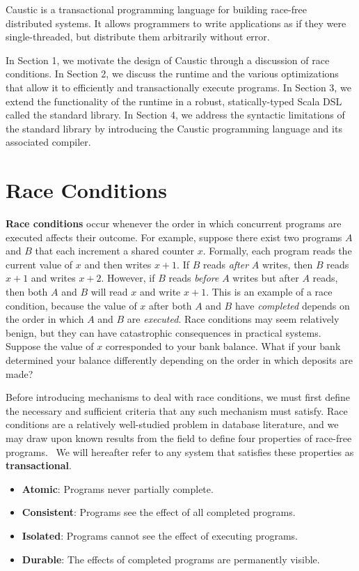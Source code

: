 \documentclass[../main.tex]{subfiles}
\begin{document}
Caustic is a transactional programming language for building race-free distributed systems. It
allows programmers to write applications as if they were single-threaded, but distribute them
arbitrarily without error.

In Section 1, we motivate the design of Caustic through a discussion of race conditions. In Section
2, we discuss the runtime and the various optimizations that allow it to efficiently and
transactionally execute programs. In Section 3, we extend the functionality of the runtime in a
robust, statically-typed Scala DSL called the standard library. In Section 4, we address
the syntactic limitations of the standard library by introducing the Caustic programming language
and its associated compiler.

\section{Race Conditions}
\textbf{Race conditions} occur whenever the order in which concurrent programs are executed affects
their outcome. For example, suppose there exist two programs $A$ and $B$ that each increment a
shared counter $x$. Formally, each program reads the current value of $x$ and then writes $x + 1$.
If $B$ reads \emph{after} $A$ writes, then $B$ reads $x + 1$ and writes $x + 2$. However, if $B$
reads \emph{before} $A$ writes but after $A$ reads, then both $A$ and $B$ will read $x$ and write
$x + 1$. This is an example of a race condition, because the value of $x$ after both
$A$ and $B$ have \emph{completed} depends on the order in which $A$ and $B$ are \emph{executed}.
Race conditions may seem relatively benign, but they can have catastrophic consequences in practical
systems. Suppose the value of $x$ corresponded to your bank balance. What if your bank determined
your balance differently depending on the order in which deposits are made?

Before introducing mechanisms to deal with race conditions, we must first define the necessary and
sufficient criteria that any such mechanism must satisfy. Race conditions are a relatively
well-studied problem in database literature, and we may draw upon known results from the field to
define four properties of race-free programs.~\cite{transactions} We will hereafter refer to
any system that satisfies these properties as \textbf{transactional}.

\begin{itemize}
  \item \textbf{Atomic}: Programs never partially complete.
  \item \textbf{Consistent}: Programs see the effect of all completed programs.
  \item \textbf{Isolated}: Programs cannot see the effect of executing programs.
  \item \textbf{Durable}: The effects of completed programs are permanently visible.
\end{itemize}
\end{document}

